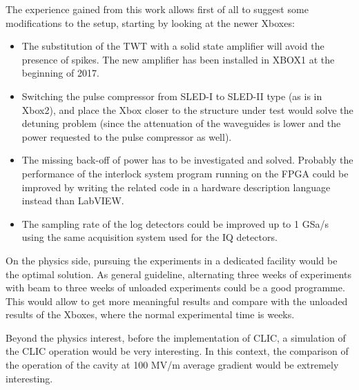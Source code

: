 The experience gained from this work allows first of all to suggest some modifications to the setup, starting by looking at the newer Xboxes:
\begin{itemize}
\item The substitution of the TWT with a solid state amplifier will avoid the presence of spikes. The new amplifier has been installed in XBOX1 at the beginning of 2017.
\item Switching the pulse compressor from SLED-I to SLED-II type (as is in Xbox2), and place the Xbox closer to the structure under test would solve the detuning problem (since the attenuation of the waveguides is lower and the power requested to the pulse compressor as well).
\item The missing back-off of power has to be investigated and solved. Probably the performance of the interlock system program running on the FPGA could be improved by writing the related code in a hardware description language instead than LabVIEW.
\item The sampling rate of the log detectors could be improved up to 1 GSa/s using the same acquisition system used for the IQ detectors.
\end{itemize}

On the physics side, pursuing the experiments in a dedicated facility would be the optimal solution. As general guideline, alternating three weeks of experiments with beam to three weeks of unloaded experiments could be a good programme. This would allow to get more meaningful results and compare with the unloaded results of the Xboxes, where the normal experimental time is weeks.

Beyond the physics interest, before the implementation of CLIC, a simulation of the CLIC operation would be very interesting. In this context, the comparison of the operation of the cavity at 100 MV/m average gradient would be extremely interesting.